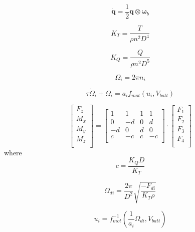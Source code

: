 \documentclass{article}
\numberwithin{equation}{section} %
\begin{document}
\begin{equation}
\dot{\boldsymbol{q}} = \frac{1}{2} \boldsymbol{q} \otimes \boldsymbol{\omega}_b
\end{equation}

\begin{equation}
K_T = \frac{T}{\rho n^2 D^4}
\end{equation}

\begin{equation}
K_Q = \frac{Q}{\rho n^2 D^5}
\end{equation}

\begin{equation}
\Omega_i = 2 \pi n_i
\end{equation}

\begin{equation}
\tau \dot{\Omega}_i + \Omega_i = a_i f_{mot} \left(u_i, V_{batt} \right)
\end{equation}

\begin{equation}
\begin{bmatrix}
	F_z \\
	M_x \\
	M_y \\
	M_z \\
\end{bmatrix}
=
\begin{bmatrix}
	1 & 1 & 1 & 1 \\
	0 &-d & 0 & d \\
   -d & 0 & d & 0 \\
	c &-c & c &-c \\
\end{bmatrix}
\cdot
\begin{bmatrix}
	F_1 \\
	F_2 \\
	F_3 \\
	F_4 \\
\end{bmatrix}
\end{equation}
where
\begin{equation}
c = \frac{K_Q D}{K_T}
\end{equation}

\begin{equation}
\Omega_{di}=\frac{2 \pi}{D^2} \sqrt{ \frac{-F_{di}}{K_T \rho}}
\end{equation}

\begin{equation}
u_i = f_{mot}^{-1} \left( \frac{1}{a_i} \Omega_{di}, V_{batt} \right)
\end{equation}
\end{document}
